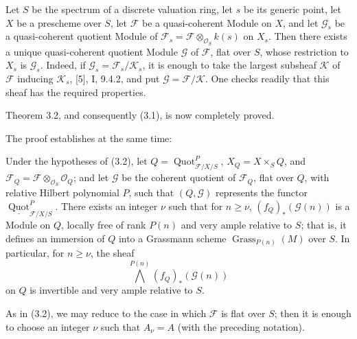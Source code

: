  Let $S$ be the spectrum of a discrete valuation ring, let
$s$ be its generic point, let $X$ be a prescheme over $S$, let $\mathcal F$ be
a quasi-coherent Module on $X$, and let $\mathcal G_s$ be a quasi-coherent
quotient Module of
$\mathcal F_s=\mathcal F\otimes_{\mathcal O_S}k(s)$ on $X_s$. Then there
exists a unique quasi-coherent quotient Module $\mathcal G$ of $\mathcal F$,
flat over $S$, whose restriction to $X_s$ is $\mathcal G_s$.
Indeed, if $\mathcal G_s=\mathcal F_s/\mathcal K_s$, it is enough to take the
largest subsheaf $\mathcal K$ of $\mathcal F$ inducing $\mathcal K_s$, [5], I,
9.4.2, and put $\mathcal G=\mathcal F/\mathcal K$. One checks readily that
this sheaf has the required properties.

Theorem 3.2, and consequently (3.1), is now completely proved.

The proof establishes at the same time:

 Under the hypotheses of (3.2), let
$Q=\operatorname{Quot}^P_{\mathcal F/X/S}$, $X_Q=X\times_SQ$, and
$\mathcal F_Q=\mathcal F\otimes_{\mathcal O_S}\mathcal O_Q$; and let
$\mathcal G$ be the coherent quotient of $\mathcal F_Q$, flat over $Q$, with
relative Hilbert polynomial $P$, such that $(Q,\mathcal G)$ represents the
functor $\underline{\operatorname{Quot}}^P_{\mathcal F/X/S}$. There exists an
integer $\nu$ such that for $n\geq\nu$, $(f_Q)_*(\mathcal G(n))$ is a Module on
$Q$, locally free of rank $P(n)$ and very ample relative to $S$; that is, it
defines an immersion of $Q$ into a Grassmann scheme
$\operatorname{Grass}_{P(n)}(M)$ over $S$. In particular, for $n\geq\nu$, the
sheaf
\[
\bigwedge^{P(n)}(f_Q)_*(\mathcal G(n))
\]
on $Q$ is invertible and very ample relative to $S$.

As in (3.2), we may reduce to the case in which $\mathcal F$ is flat over $S$;
then it is enough to choose an integer $\nu$ such that $A_\nu=A$ (with the
preceding notation).

